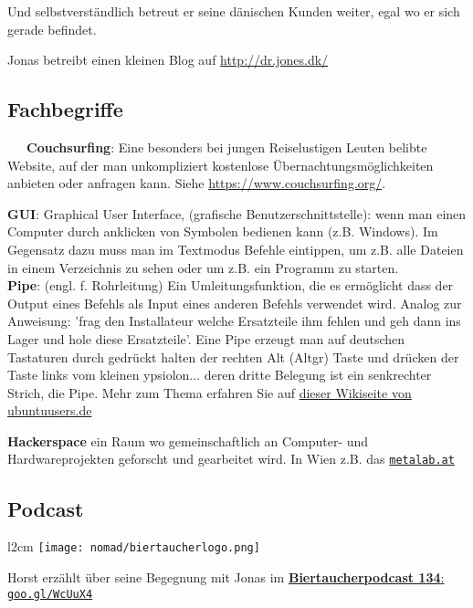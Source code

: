 \documentclass[10pt,a4paper,ngerman,twoside]{article} %
\begin{document}
Und selbstverständlich betreut er seine dänischen Kunden weiter, egal wo er sich gerade befindet.

Jonas betreibt einen kleinen Blog auf \url{http://dr.jones.dk/} 



\subsection*{Fachbegriffe}

~~~\textbf{Couchsurfing}: Eine besonders bei jungen Reiselustigen Leuten belibte Website, auf der man unkompliziert kostenlose Übernachtungsmöglichkeiten anbieten oder anfragen kann. Siehe \url{https://www.couchsurfing.org/}.

\textbf{GUI}: Graphical User Interface, (grafische Benutzerschnittstelle): wenn man einen Computer durch anklicken von Symbolen bedienen kann (z.B. Windows). Im Gegensatz dazu muss man im Textmodus Befehle eintippen, um z.B. alle Dateien in einem Verzeichnis zu sehen oder um z.B. ein Programm zu starten. \\

\textbf{Pipe}: (engl. f. Rohrleitung) Ein Umleitungsfunktion, die es ermöglicht dass der Output eines Befehls als Input eines anderen Befehls verwendet wird. Analog zur Anweisung: 'frag den Installateur welche Ersatzteile ihm fehlen und geh dann ins Lager und hole diese Ersatzteile'. Eine Pipe erzeugt man auf deutschen Tastaturen durch gedrückt halten der rechten Alt (Altgr) Taste und drücken der Taste links vom kleinen ypsiolon... deren dritte Belegung ist ein senkrechter Strich, die Pipe. Mehr zum Thema erfahren Sie auf \href{http://wiki.ubuntuusers.de/Shell/Umleitungen}{dieser Wikiseite von ubuntuusers.de} 

\textbf{Hackerspace} ein Raum wo gemeinschaftlich an Computer- und Hardwareprojekten geforscht und gearbeitet wird. In Wien z.B. das \href{http://metalab.at}{\texttt{metalab.at}} 

\subsection*{Podcast}
\begin{wrapfigure}{l}{2cm}
\texttt{[image: nomad/biertaucherlogo.png]}
\end{wrapfigure}
Horst erzählt über seine Begegnung mit Jonas im  \href{http://spielend-programmieren.at/de:podcast:biertaucher:2013:134}{\textbf{Biertaucherpodcast 134}: \texttt{goo.gl/WcUuX4}}
\end{document}

